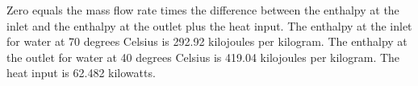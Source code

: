 Zero equals the mass flow rate times the difference between the enthalpy at the inlet and the enthalpy at the outlet plus the heat input. The enthalpy at the inlet for water at 70 degrees Celsius is 292.92 kilojoules per kilogram. The enthalpy at the outlet for water at 40 degrees Celsius is 419.04 kilojoules per kilogram. The heat input is 62.482 kilowatts.